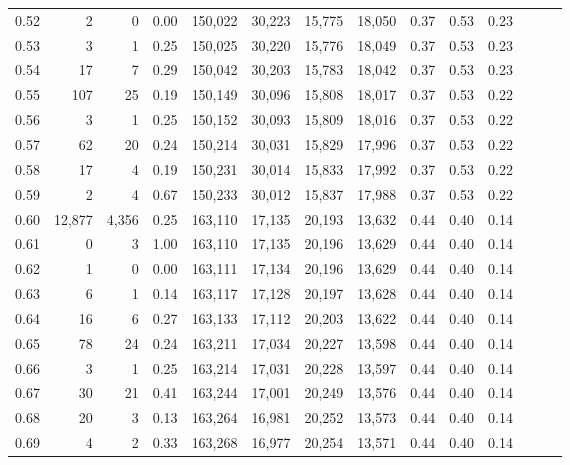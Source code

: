\begin{tabular}{rrrrrrrrrrrrrr}
0.52 &       2 &      0 &  0.00 &  150,022 &   30,223 &  15,775 &  18,050 &  0.37 &  0.53 &      0.23 \\
0.53 &       3 &      1 &  0.25 &  150,025 &   30,220 &  15,776 &  18,049 &  0.37 &  0.53 &      0.23 \\
0.54 &      17 &      7 &  0.29 &  150,042 &   30,203 &  15,783 &  18,042 &  0.37 &  0.53 &      0.23 \\
0.55 &     107 &     25 &  0.19 &  150,149 &   30,096 &  15,808 &  18,017 &  0.37 &  0.53 &      0.22 \\
0.56 &       3 &      1 &  0.25 &  150,152 &   30,093 &  15,809 &  18,016 &  0.37 &  0.53 &      0.22 \\
0.57 &      62 &     20 &  0.24 &  150,214 &   30,031 &  15,829 &  17,996 &  0.37 &  0.53 &      0.22 \\
0.58 &      17 &      4 &  0.19 &  150,231 &   30,014 &  15,833 &  17,992 &  0.37 &  0.53 &      0.22 \\
0.59 &       2 &      4 &  0.67 &  150,233 &   30,012 &  15,837 &  17,988 &  0.37 &  0.53 &      0.22 \\
0.60 &  12,877 &  4,356 &  0.25 &  163,110 &   17,135 &  20,193 &  13,632 &  0.44 &  0.40 &      0.14 \\
0.61 &       0 &      3 &  1.00 &  163,110 &   17,135 &  20,196 &  13,629 &  0.44 &  0.40 &      0.14 \\
0.62 &       1 &      0 &  0.00 &  163,111 &   17,134 &  20,196 &  13,629 &  0.44 &  0.40 &      0.14 \\
0.63 &       6 &      1 &  0.14 &  163,117 &   17,128 &  20,197 &  13,628 &  0.44 &  0.40 &      0.14 \\
0.64 &      16 &      6 &  0.27 &  163,133 &   17,112 &  20,203 &  13,622 &  0.44 &  0.40 &      0.14 \\
0.65 &      78 &     24 &  0.24 &  163,211 &   17,034 &  20,227 &  13,598 &  0.44 &  0.40 &      0.14 \\
0.66 &       3 &      1 &  0.25 &  163,214 &   17,031 &  20,228 &  13,597 &  0.44 &  0.40 &      0.14 \\
0.67 &      30 &     21 &  0.41 &  163,244 &   17,001 &  20,249 &  13,576 &  0.44 &  0.40 &      0.14 \\
0.68 &      20 &      3 &  0.13 &  163,264 &   16,981 &  20,252 &  13,573 &  0.44 &  0.40 &      0.14 \\
0.69 &       4 &      2 &  0.33 &  163,268 &   16,977 &  20,254 &  13,571 &  0.44 &  0.40 &      0.14 \\

\end{tabular}
